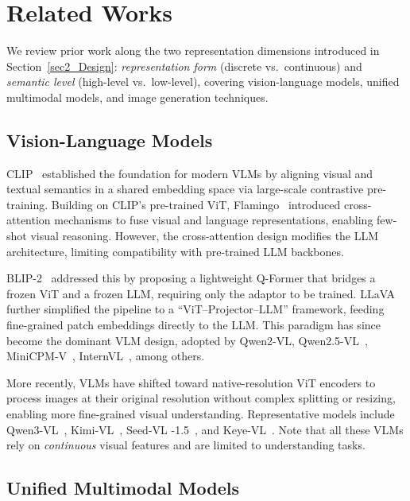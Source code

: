 \documentclass[11pt, a4paper, logo, copyright]{googledeepmind}
\begin{document}
\section{Related Works}

We review prior work along the two representation dimensions introduced in Section~\ref{sec2_Design}: \emph{representation form} (discrete vs.\ continuous) and \emph{semantic level} (high-level vs.\ low-level), covering vision-language models, unified multimodal models, and image generation techniques.

\subsection{Vision-Language Models}

CLIP~\citep{radford2021learning} established the foundation for modern VLMs by aligning visual and textual semantics in a shared embedding space via large-scale contrastive pre-training. Building on CLIP's pre-trained ViT, Flamingo~\citep{alayrac2022flamingo} introduced cross-attention mechanisms to fuse visual and language representations, enabling few-shot visual reasoning. However, the cross-attention design modifies the LLM architecture, limiting compatibility with pre-trained LLM backbones.

BLIP-2~\citep{li2023blip} addressed this by proposing a lightweight Q-Former that bridges a frozen ViT and a frozen LLM, requiring only the adaptor to be trained. LLaVA~\citep{liu2023visual} further simplified the pipeline to a ``ViT--Projector--LLM'' framework, feeding fine-grained patch embeddings directly to the LLM. This paradigm has since become the dominant VLM design, adopted by Qwen2-VL, Qwen2.5-VL~\citep{wang2024qwen2, bai2025qwen2}, MiniCPM-V~\citep{yao2024minicpm}, InternVL~\citep{chen2024internvl}, among others.

More recently, VLMs have shifted toward native-resolution ViT encoders to process images at their original resolution without complex splitting or resizing, enabling more fine-grained visual understanding. Representative models include Qwen3-VL~\citep{Qwen3-VL}, Kimi-VL~\citep{team2025kimi}, Seed-VL -1.5~\citep{guo2025seed1}, and Keye-VL~\citep{yang2025kwai}. Note that all these VLMs rely on \emph{continuous} visual features and are limited to understanding tasks.

\subsection{Unified Multimodal Models}
\end{document}
